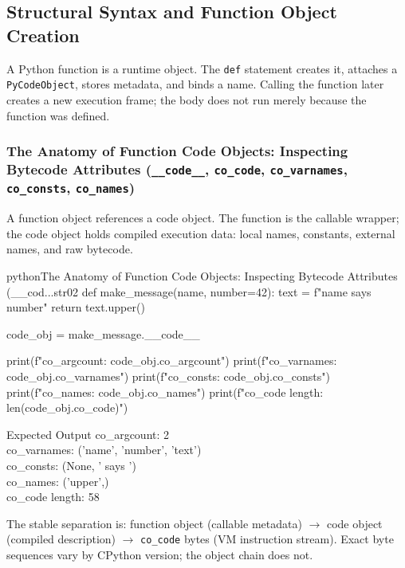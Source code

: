 \subsection{Structural Syntax and Function Object Creation}

A Python function is a runtime object. The \texttt{def} statement creates it, attaches a \texttt{PyCodeObject}, stores metadata, and binds a name. Calling the function later creates a new execution frame; the body does not run merely because the function was defined.

\subsubsection{The Anatomy of Function Code Objects: Inspecting Bytecode Attributes (\texttt{\_\_code\_\_}, \texttt{co\_code}, \texttt{co\_varnames}, \texttt{co\_consts}, \texttt{co\_names})}

A function object references a code object. The function is the callable wrapper; the code object holds compiled execution data: local names, constants, external names, and raw bytecode.

\begin{codebox}[]{python}{The Anatomy of Function Code Objects: Inspecting Bytecode Attributes (\_\_cod...}{str02}
def make_message(name, number=42):
    text = f"{name} says {number}"
    return text.upper()

code_obj = make_message.__code__

print(f"co_argcount:    {code_obj.co_argcount}")
print(f"co_varnames:    {code_obj.co_varnames}")
print(f"co_consts:      {code_obj.co_consts}")
print(f"co_names:       {code_obj.co_names}")
print(f"co_code length: {len(code_obj.co_code)}")
\end{codebox}


\begin{iobox}{Expected Output}
co\_argcount:    2 \\
co\_varnames:    ('name', 'number', 'text') \\
co\_consts:      (None, ' says ') \\
co\_names:       ('upper',) \\
co\_code length: 58 \\
\end{iobox}




The stable separation is: function object (callable metadata) $\rightarrow$ code object (compiled description) $\rightarrow$ \texttt{co\_code} bytes (VM instruction stream). Exact byte sequences vary by CPython version; the object chain does not.

